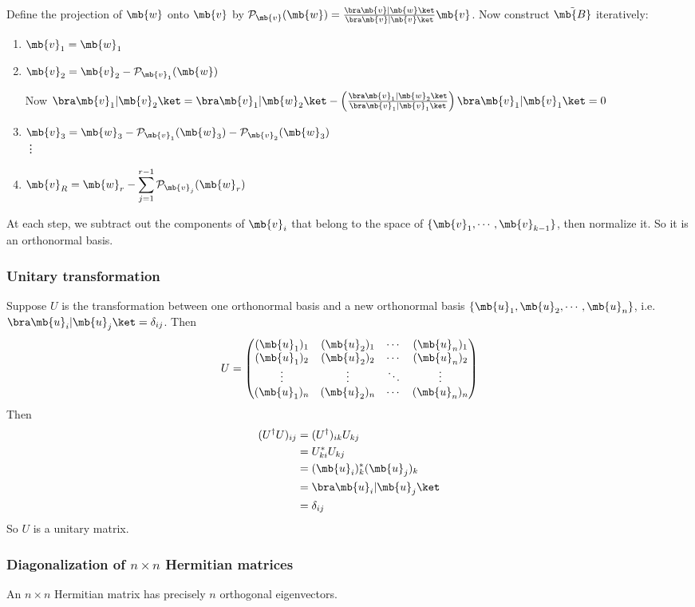 \documentclass[a4paper]{article}
\begin{document}
Define the projection of $\mb{w}$ onto $\mb{v}$ by $\mathcal{P}_\mb{v}(\mb{w}) = \frac{\bra \mb{v}|\mb{w}\ket}{\bra \mb{v}|\mb{v}\ket} \mb{v}$. Now construct $\tilde{\mb{B}}$ iteratively:
\begin{enumerate}
\item $\mb{v}_1 = \mb{w}_1$
\item $\mb{v}_2 = \mb{v}_2 - \mathcal{P}_{\mb{v}_1}(\mb{w})$

\note Now $\bra \mb{v}_1|\mb{v}_2\ket = \bra \mb{v}_1|\mb{w}_2\ket - \left(\frac{\bra \mb{v}_1|\mb{w}_2\ket}{\bra \mb{v}_1 | \mb{v}_1\ket}\right) \bra \mb{v}_1|\mb{v}_1\ket = 0$
\item $\mb{v}_3 = \mb{w}_3 - \mathcal{P}_{\mb{v}_1}(\mb{w}_3) - \mathcal{P}_{\mb{v}_2}(\mb{w}_3)$\\
\vdots
\item $\displaystyle \mb{v}_R = \mb{w}_r - \sum_{j = 1}^{r - 1} \mathcal{P}_{\mb{v}_j}(\mb{w}_r)$
\end{enumerate}
At each step, we subtract out the components of $\mb{v}_i$ that belong to the space of $\{\mb{v}_1, \cdots, \mb{v}_{k - 1}\}$, then normalize it. So it is an orthonormal basis.

\subsubsection{Unitary transformation}
Suppose $U$ is the transformation between one orthonormal basis and a new orthonormal basis $\{\mb{u}_1, \mb{u}_2, \cdots, \mb{u}_n\}$, i.e. $\bra \mb{u}_i| \mb{u}_j\ket = \delta_{ij}$. Then
\[
U = 
\begin{pmatrix}
  (\mb{u}_1)_1 & (\mb{u}_2)_1 & \cdots & (\mb{u}_n)_1\\
  (\mb{u}_1)_2 & (\mb{u}_2)_2 & \cdots & (\mb{u}_n)_2\\
  \vdots & \vdots & \ddots & \vdots\\
  (\mb{u}_1)_n & (\mb{u}_2)_n & \cdots & (\mb{u}_n)_n
\end{pmatrix}
\]
Then 
\begin{align*}
  (U^\dagger U)_{ij} &= (U^\dagger)_{ik}U_{kj}\\
  &= U_{ki}^* U_{kj}\\
  &= (\mb{u}_i)^*_k(\mb{u}_j)_k\\
  &= \bra \mb{u}_i | \mb{u}_j \ket\\
  &= \delta_{ij}
\end{align*}
So $U$ is a unitary matrix.
\subsubsection{Diagonalization of \texorpdfstring{$n\times n$}{n x n} Hermitian matrices}
\begin{thm}
  An $n\times n$ Hermitian matrix has precisely $n$ orthogonal eigenvectors.
\end{thm}
\end{document}
